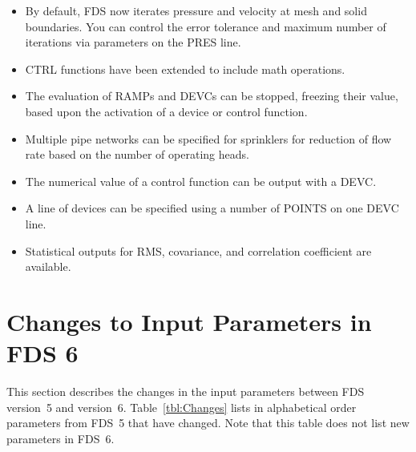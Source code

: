 \documentclass[11pt]{book}
\begin{document}

    \begin{itemize}
    \item By default, FDS now iterates pressure and velocity at mesh and solid boundaries. You can control the error tolerance and maximum number of iterations via parameters on the {\ct PRES} line.
    \end{itemize}


    \begin{itemize}
    \item {\ct CTRL} functions have been extended to include math operations.
    \item The evaluation of {\ct RAMP}s and {\ct DEVC}s can be stopped, freezing their value, based upon the activation of a device or control function.
    \end{itemize}


    \begin{itemize}
    \item Multiple pipe networks can be specified for sprinklers for reduction of flow rate based on the number of operating heads.
    \item The numerical value of a control function can be output with a {\ct DEVC}.
    \item A line of devices can be specified using a number of {\ct POINTS} on one {\ct DEVC} line.
    \item Statistical outputs for RMS, covariance, and correlation coefficient are available.
    \end{itemize}





\section{Changes to Input Parameters in FDS 6}

This section describes the changes in the input parameters between FDS version~5 and version~6. Table~\ref{tbl:Changes} lists in alphabetical order parameters from FDS~5 that have changed. Note that this table does not list new parameters in FDS~6.
\end{document}
